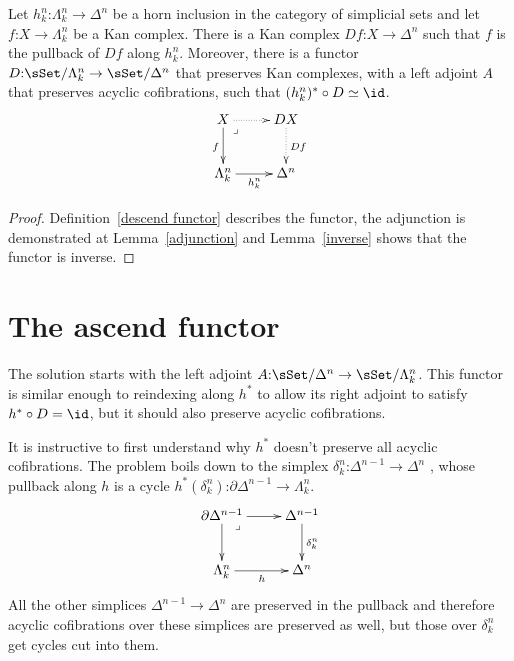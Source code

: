 \documentclass{tac}
\makeatletter
\newcommand\hide[1]{}
\newcommand\of{\mathord:}
\newcommand\ri{^*}
\newcommand\pulled{\ar@{}[dr]|(.2)\lrcorner}
\newcommand\simplex[1]{\Delta^{#1}}
\newcommand\horn[2]{\Lambda^{#1}_{#2}}
\newcommand\cycle[1]{\partial\Delta^{#1}}
\makeatother
\begin{document}
\begin{proposition}
Let \( h^n_k\of \horn{n}{k} \to \simplex{n} \) be a horn inclusion in the category of
simplicial sets and let \( f\of X\to \horn{n}{k} \) be a Kan complex. There is a
Kan complex \( Df\of X \to \simplex{n} \) such that \( f \) is the pullback of 
\( Df \) along \( h^n_k \). Moreover, there is a functor 
\( D\of \sSet/\horn{n}{k}\to \sSet/\simplex{n} \) that preserves Kan complexes, 
with a left adjoint \( A \) that preserves acyclic cofibrations, such that 
\( (h^n_k)\ri \circ D\simeq \id \).
\[\xymatrix{
X\ar[d]_f\ar@{.>}[r]\pulled & DX \ar@{.>}[d]^{Df}\\
\horn{n}{k} \ar[r]_{h^n_k} & \simplex{n}
}\]
\end{proposition}
\hide{ 
  lots of undefined terms here\dots 

  Jaap would interupt me before the first sentence ended, but we could go over
  the context and the definitions down here, using the informal decription
  above as a guide.

  Maybe I could add a `bear with me' on top.
}
\hide{
  Functors \( D^n_k \) and \( A^n_k \)? 
}
\begin{proof}
Definition~\ref{descend functor} describes the functor, the 
adjunction is demonstrated at Lemma~\ref{adjunction} and 
Lemma~\ref{inverse} shows that the functor is inverse.
\end{proof}

\section{The ascend functor}
The solution starts with the left adjoint 
\( A\of \sSet/\simplex{n} \to \sSet/\horn{n}{k} \). This functor is similar 
enough to reindexing along \( h\ri \) to allow its right adjoint to satisfy 
\( h\ri\circ D = \id \), but it should also preserve acyclic cofibrations. 

It is instructive to first understand why \( h\ri \) doesn't preserve all 
acyclic cofibrations. The problem boils down to the simplex
\( \delta^n_k\of \simplex {n-1}\to\simplex{n} \) \hide{\( \delta^n_k \)?},
whose pullback along \( h \) is a cycle 
\( h\ri(\delta^n_k)\of \cycle {n-1}\to\horn{n}{k} \).
\[\xymatrix{
\cycle {n-1}\ar[d]\ar[r]\pulled & \simplex {n-1} \ar[d]^{\delta^n_k}\\
\horn{n}{k} \ar[r]_h & \simplex{n}
}\]
All the other simplices \( \simplex {n-1}\to\simplex{n} \) are preserved in the pullback
and therefore acyclic cofibrations over these simplices are preserved as well,
but those over \( \delta^n_k \) get cycles cut into them.
\end{document}
